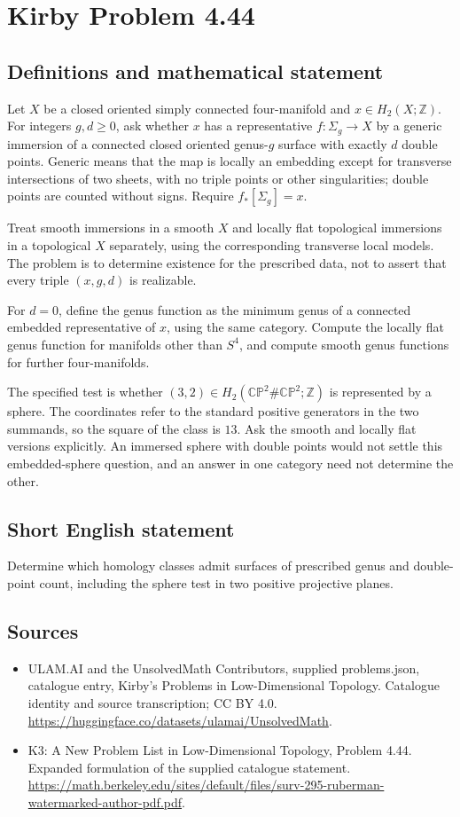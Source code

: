 \documentclass[11pt,a4paper]{article}
\begin{document}
\section*{Kirby Problem 4.44}\label{statement}

\subsection{Definitions and mathematical statement}
Let $X$ be a closed oriented simply connected four-manifold and $x\in H_2(X;\mathbb Z)$. For integers $g,d\ge0$, ask whether $x$ has a representative $f:\Sigma_g\to X$ by a generic immersion of a connected closed oriented genus-$g$ surface with exactly $d$ double points. Generic means that the map is locally an embedding except for transverse intersections of two sheets, with no triple points or other singularities; double points are counted without signs. Require $f_*[\Sigma_g]=x$.

Treat smooth immersions in a smooth $X$ and locally flat topological immersions in a topological $X$ separately, using the corresponding transverse local models. The problem is to determine existence for the prescribed data, not to assert that every triple $(x,g,d)$ is realizable.

For $d=0$, define the genus function as the minimum genus of a connected embedded representative of $x$, using the same category. Compute the locally flat genus function for manifolds other than $S^4$, and compute smooth genus functions for further four-manifolds.

The specified test is whether $(3,2)\in H_2(\mathbb{CP}^2\#\mathbb{CP}^2;\mathbb Z)$ is represented by a sphere. The coordinates refer to the standard positive generators in the two summands, so the square of the class is $13$. Ask the smooth and locally flat versions explicitly. An immersed sphere with double points would not settle this embedded-sphere question, and an answer in one category need not determine the other.
\subsection{Short English statement}
Determine which homology classes admit surfaces of prescribed genus and double-point count, including the sphere test in two positive projective planes.
\subsection{Sources}
\begin{itemize}
\item[S1] ULAM.AI and the UnsolvedMath Contributors, supplied problems.json, catalogue entry, Kirby's Problems in Low-Dimensional Topology. Catalogue identity and source transcription; CC BY 4.0.
\url{https://huggingface.co/datasets/ulamai/UnsolvedMath}.
\item[S2] K3: A New Problem List in Low-Dimensional Topology, Problem 4.44. Expanded formulation of the supplied catalogue statement.
\url{https://math.berkeley.edu/sites/default/files/surv-295-ruberman-watermarked-author-pdf.pdf}.
\end{itemize}
\end{document}
